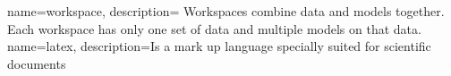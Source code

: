 {
    name=workspace,
    description={%
        Workspaces combine data and models together. Each workspace has only one set of data and multiple models on that data.
    }
}
{
    name=latex,
    description={Is a mark up language specially suited for scientific documents}
}